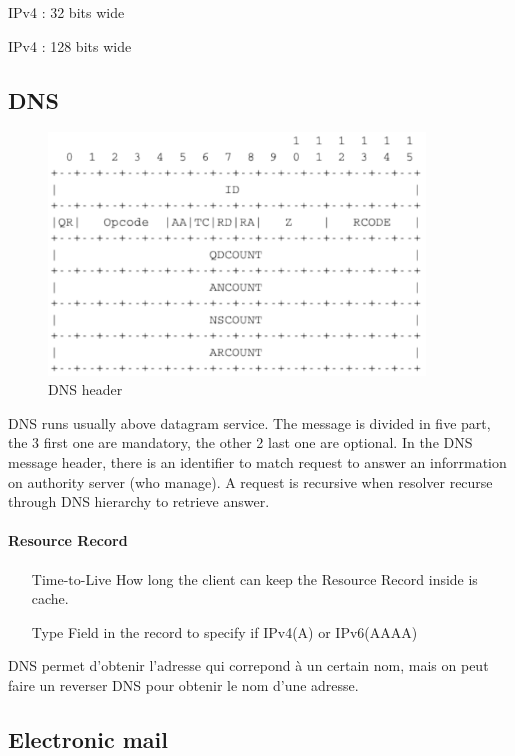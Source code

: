 \begin{description}
    \item IPv4 : 32 bits wide
    \item IPv4 : 128 bits wide
\end{description}

\subsection{DNS}

\begin{figure}[h]
    \centering
    \includegraphics[width=10cm]{dnsheader.png}
    \caption{DNS header}
\end{figure}
DNS runs usually above datagram service. The message is divided in five part, the 3 first one are mandatory, the other 2 last one are optional. In the DNS message header, there is an identifier to match request to answer an inforrmation on authority server (who manage). A request is recursive when resolver recurse through DNS hierarchy to retrieve answer. 
\paragraph{Resource Record} 
\begin{itemize}
	\item[Time-to-Live] How long the client can keep the Resource Record inside is cache.
	\item[Type] Field in the record to specify if IPv4(A) or IPv6(AAAA)
\end{itemize}

DNS permet d'obtenir l'adresse qui correpond à un certain nom, mais on peut
faire un reverser DNS pour obtenir le nom d'une adresse.

\subsection{Electronic mail}

